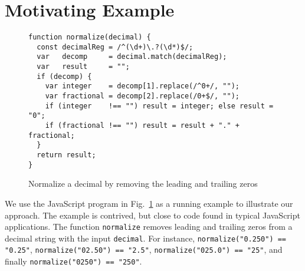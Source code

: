 
\section{Motivating Example}\label{sec:mot}

\begin{figure}[tb]
\begin{center}
\begin{verbatim}
function normalize(decimal) {
  const decimalReg = /^(\d+)\.?(\d*)$/;
  var   decomp     = decimal.match(decimalReg);
  var   result     = "";
  if (decomp) {
    var integer    = decomp[1].replace(/^0+/, "");
    var fractional = decomp[2].replace(/0+$/, "");
    if (integer    !== "") result = integer; else result = "0"; 
    if (fractional !== "") result = result + "." + fractional;
  }
  return result;
}
\end{verbatim}
\end{center}
\vspace{-4mm}
\caption{Normalize a decimal by removing the leading and trailing zeros}
\label{fig-run-exmp}
\vspace{-4mm}
\end{figure}

We use the JavaScript program in Fig.~\ref{fig-run-exmp} as a running example to illustrate our approach. The example is
contrived, but close to code found in typical JavaScript
applications.
 The function {\tt normalize}   removes leading and trailing zeros from a decimal string with the input %
{\tt decimal}. For instance, 
 \texttt{normalize("0.250") == "0.25"},
 \texttt{normalize("02.50") == "2.5"},
 \texttt{normalize("025.0") == "25"},
and finally  \texttt{normalize("0250") == "250"}.


